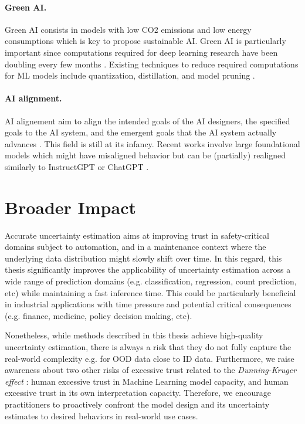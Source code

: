 \paragraph{Green AI.} Green AI consists in models with low CO2 emissions and low energy consumptions which is key to propose sustainable AI. Green AI is particularly important since computations required for deep learning research have been doubling every few months \cite{schwartz2019greenAI}. Existing techniques to reduce required computations for ML models include quantization, distillation, and model pruning \cite{neill2020compression}. 

\paragraph{AI alignment.} AI alignement aim to align the intended goals of the AI designers,  the specified goals to the AI system, and the emergent goals that the AI system actually advances \cite{bostrom2014superintelligence, gabriel2020AI}. This field is still at its infancy. Recent works involve large foundational models \cite{gpt, rombach2021highresolution, galactica} which might have misaligned behavior but can be (partially) realigned similarly to InstructGPT or ChatGPT \cite{instructgpt, chatgpt}.

\section{Broader Impact}

Accurate uncertainty estimation aims at improving trust in safety-critical domains subject to automation, and in a maintenance context where the underlying data distribution might slowly shift over time. In this regard, this thesis significantly improves the applicability of uncertainty estimation across a wide range of prediction domains (e.g. classification, regression, count prediction, etc) while maintaining a fast inference time. This could be particularly beneficial in industrial applications with time pressure and potential critical consequences (e.g. finance, medicine, policy decision making, etc).

Nonetheless, while methods described in this thesis achieve high-quality uncertainty estimation, there is always a risk that they do not fully capture the real-world complexity e.g. for OOD data close to ID data. Furthermore, we raise awareness about two other risks of excessive trust related to the \emph{Dunning-Kruger effect} \citep{dunning-kruger}: human excessive trust in Machine Learning model capacity, and human excessive trust in its own interpretation capacity. Therefore, we encourage practitioners to proactively confront the model design and its uncertainty estimates to desired behaviors in real-world use cases.

